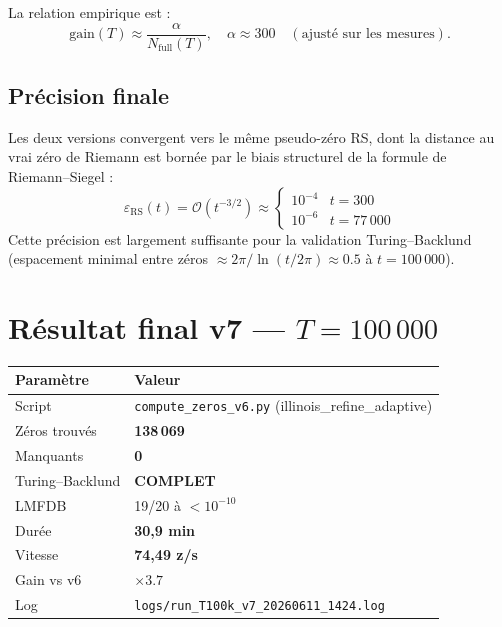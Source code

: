 \documentclass[11pt,a4paper]{article}
\begin{document}
La relation empirique est :
\begin{equation}
  \text{gain}(T) \approx \frac{\alpha}{N_\text{full}(T)},
  \quad \alpha \approx 300 \quad (\text{ajusté sur les mesures}).
\end{equation}

\subsection*{Précision finale}

Les deux versions convergent vers le même pseudo-zéro RS, dont la distance au vrai
zéro de Riemann est bornée par le biais structurel de la formule de Riemann--Siegel :
\begin{equation}
  \varepsilon_\text{RS}(t) = \mathcal{O}\!\left(t^{-3/2}\right)
  \approx \begin{cases}
    10^{-4} & t = 300 \\
    10^{-6} & t = 77\,000
  \end{cases}
\end{equation}
Cette précision est largement suffisante pour la validation Turing--Backlund
(espacement minimal entre zéros $\approx 2\pi/\ln(t/2\pi) \approx 0.5$ à $t = 100\,000$).

\section{Résultat final v7 --- $T = 100\,000$}

\begin{center}
\begin{tabular}{ll}
\toprule
Paramètre & Valeur \\
\midrule
Script         & \texttt{compute\_zeros\_v6.py} (illinois\_refine\_adaptive) \\
Zéros trouvés  & \textbf{138\,069} \\
Manquants      & \textbf{0} \\
Turing--Backlund & \textbf{COMPLET} \\
LMFDB          & 19/20 à $< 10^{-10}$ \\
Durée          & \textbf{30,9 min} \\
Vitesse        & \textbf{74,49 z/s} \\
Gain vs v6     & \textbf{$\times 3.7$} \\
Log            & \texttt{logs/run\_T100k\_v7\_20260611\_1424.log} \\
\bottomrule
\end{tabular}
\end{center}
\end{document}
